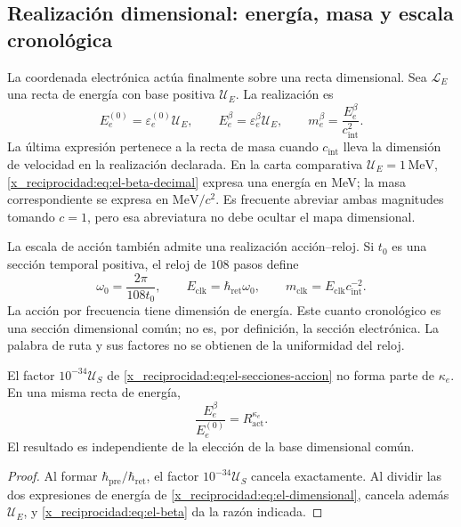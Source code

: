 \subsection{Realización dimensional: energía, masa y escala cronológica}

La coordenada electrónica actúa finalmente sobre una recta dimensional.
Sea \(\mathcal L_E\) una recta de energía con base positiva
\(\mathcal U_E\). La realización es
\begin{equation}
 E_e^{(0)}=\varepsilon_e^{(0)}\mathcal U_E,\qquad
 E_e^\beta=\varepsilon_e^\beta\mathcal U_E,
 \qquad m_e^\beta=\frac{E_e^\beta}{c_{\mathrm{int}}^2}.
 \label{x_reciprocidad:eq:el-dimensional}
\end{equation}
La última expresión pertenece a la recta de masa cuando
\(c_{\mathrm{int}}\) lleva la dimensión de velocidad en la realización
declarada. En la carta comparativa \(\mathcal U_E=1\,\mathrm{MeV}\),
\eqref{x_reciprocidad:eq:el-beta-decimal} expresa una energía en MeV; la masa
correspondiente se expresa en \(\mathrm{MeV}/c^2\). Es frecuente
abreviar ambas magnitudes tomando \(c=1\), pero esa abreviatura no
debe ocultar el mapa dimensional.

La escala de acción también admite una realización acción--reloj. Si
\(t_0\) es una sección temporal positiva, el reloj de \(108\) pasos
define
\begin{equation}
 \omega_0=\frac{2\pi}{108t_0},\qquad
 E_{\mathrm{clk}}=\hbar_{\mathrm{ret}}\omega_0,\qquad
 m_{\mathrm{clk}}=E_{\mathrm{clk}}c_{\mathrm{int}}^{-2}.
 \label{x_reciprocidad:eq:el-cuanto-reloj}
\end{equation}
La acción por frecuencia tiene dimensión de energía. Este cuanto
cronológico es una sección dimensional común; no es, por definición,
la sección electrónica. La palabra de ruta y sus factores no se
obtienen de la uniformidad del reloj.

\begin{proposition}
El factor \(10^{-34}\mathcal U_S\) de
\eqref{x_reciprocidad:eq:el-secciones-accion} no forma parte de \(\kappa_e\). En
una misma recta de energía,
\begin{equation}
 \frac{E_e^\beta}{E_e^{(0)}}=R_{\mathrm{act}}^{\kappa_e}.
 \label{x_reciprocidad:eq:el-razon-energia}
\end{equation}
El resultado es independiente de la elección de la base dimensional
común.
\end{proposition}
\begin{proof}
Al formar \(\hbar_{\mathrm{pre}}/\hbar_{\mathrm{ret}}\), el factor
\(10^{-34}\mathcal U_S\) cancela exactamente. Al dividir las dos
expresiones de energía de \eqref{x_reciprocidad:eq:el-dimensional}, cancela además
\(\mathcal U_E\), y \eqref{x_reciprocidad:eq:el-beta} da la razón indicada.
\end{proof}

